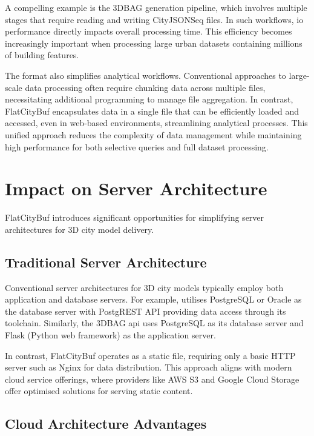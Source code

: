 A compelling example is the 3DBAG generation pipeline, which involves multiple stages that require reading and writing CityJSONSeq files. In such workflows, \ac{io} performance directly impacts overall processing time. This efficiency becomes increasingly important when processing large urban datasets containing millions of building features.

The format also simplifies analytical workflows. Conventional approaches to large-scale data processing often require chunking data across multiple files, necessitating additional programming to manage file aggregation. In contrast, FlatCityBuf encapsulates data in a single file that can be efficiently loaded and accessed, even in web-based environments, streamlining analytical processes. This unified approach reduces the complexity of data management while maintaining high performance for both selective queries and full dataset processing.

\section{Impact on Server Architecture}
\label{affect_on_server_architecture}

FlatCityBuf introduces significant opportunities for simplifying server architectures for 3D city model delivery.

\subsection{Traditional Server Architecture}
\label{traditional_server_architecture}

Conventional server architectures for 3D city models typically employ both application and database servers. For example, \citet{3dcitydb} utilises PostgreSQL or Oracle as the database server with PostgREST API \citep{postgrest} providing data access through its toolchain. Similarly, the 3DBAG \ac{api} uses PostgreSQL as its database server and Flask (Python web framework) as the application server.

In contrast, FlatCityBuf operates as a static file, requiring only a basic HTTP server such as Nginx \citep{nginx} for data distribution. This approach aligns with modern cloud service offerings, where providers like AWS S3 \citep{s3} and Google Cloud Storage \citep{gsc} offer optimised solutions for serving static content.

\subsection{Cloud Architecture Advantages}
\label{cloud_architecture_achieved}

